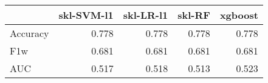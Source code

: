 \begin{tabular}{lrrrr}
\toprule
{} &  skl-SVM-l1 &  skl-LR-l1 &  skl-RF &  xgboost \\
\midrule
Accuracy &       0.778 &      0.778 &   0.778 &    0.778 \\
F1w      &       0.681 &      0.681 &   0.681 &    0.681 \\
AUC      &       0.517 &      0.518 &   0.513 &    0.523 \\
\bottomrule
\end{tabular}

